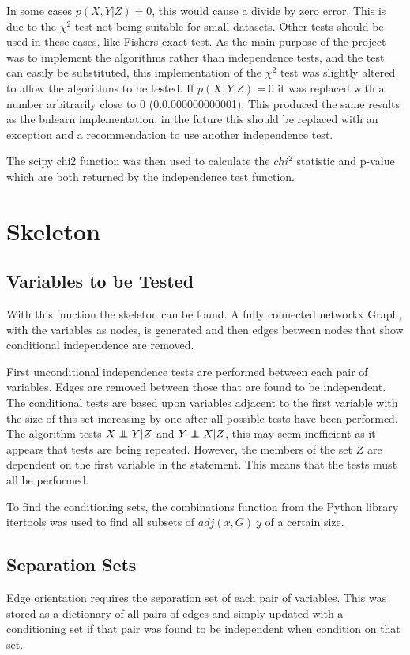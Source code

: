\documentclass{UoYCSproject}
\newcommand\independent{\protect\mathpalette{\protect\independenT}{\perp}}
\def\independenT#1#2{\mathrel{\rlap{$#1#2$}\mkern2mu{#1#2}}}
\begin{document}
In some cases $p(X,Y|Z) = 0$, this would cause a divide by zero error. This is due to the $\chi^2$ test not being suitable for small datasets. Other tests should be used in these cases, like Fishers exact test. As the main purpose of the project was to implement the algorithms rather than independence tests, and the test can easily be substituted, this implementation of the $\chi^2$ test was slightly altered to allow the algorithms to be tested. If  $p(X,Y|Z) = 0$ it was replaced with a number arbitrarily close to 0 (0.0.000000000001). This produced the same results as the bnlearn implementation, in the future this should be replaced with an exception and a recommendation to use another independence test.

The scipy chi2 function was then used to calculate the $chi^2$ statistic and p-value which are both returned by the independence test function.
\section{Skeleton}
\subsection{Variables to be Tested}
With this function the skeleton can be found. A fully connected networkx Graph, with the variables as nodes, is generated and then edges between nodes that show conditional independence are removed. 

First unconditional independence tests are performed between each pair of variables. Edges are removed between those that are found to be independent. The conditional tests are based upon variables adjacent to the first variable with the size of this set increasing by one after all possible tests have been performed. The algorithm tests $X \independent Y | Z$ and $Y \independent X | Z$, this may seem inefficient as it appears that tests are being repeated. However, the members of the set $Z$ are dependent on the first variable in the statement. This means that the tests must all be performed.

To find the conditioning sets, the combinations function from the Python library itertools was used to find all subsets of $adj(x,G)\ y$ of a certain size.

\subsection{Separation Sets}
Edge orientation requires the separation set of each pair of variables. This was stored as a dictionary of all pairs of edges and simply updated with a conditioning set if that pair was found to be independent when condition on that set.
\end{document}
